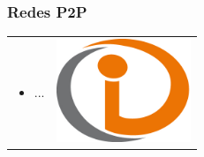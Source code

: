 \begin{frame}
\frametitle{Redes P2P}
\begin{table}
\begin{tabular}{p{7cm}p{3cm}}
\begin{itemize}
    \item ...
\end{itemize}
&
\vspace{1.5cm}
\includegraphics[width=4cm]{img/example}\\
\end{tabular}
\end{table}
\end{frame}
